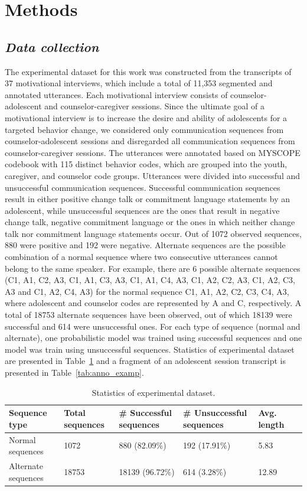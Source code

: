 \documentclass{amia}
\begin{document}
\section*{Methods}
\subsection*{\textit{Data collection}}
The experimental dataset for this work was constructed from the transcripts of 37 motivational interviews, which include a total of 11,353 segmented and annotated utterances. Each motivational interview consists of counselor-adolescent and counselor-caregiver sessions. Since the ultimate goal of a motivational interview is to increase the desire and ability of adolescents for a targeted behavior change, we considered only communication sequences from counselor-adolescent sessions and disregarded all communication sequences from counselor-caregiver sessions. The utterances were annotated based on MYSCOPE codebook \cite{carcone2013provider} with 115 distinct behavior codes, which are grouped into the youth, caregiver, and counselor code groups. Utterances were divided into successful and unsuccessful communication sequences. Successful communication sequences result in either positive change talk or commitment language statements by an adolescent, while unsuccessful sequences are the ones that result in negative change talk, negative commitment language or the ones in which neither change talk nor commitment language statements occur. Out of 1072 observed sequences, 880 were positive and 192 were negative. Alternate sequences are the possible combination of a normal sequence where two consecutive utterances cannot belong to the same speaker. For example, there are 6 possible alternate sequences ({C1, A1, C2, A3}, {C1, A1, C3, A3}, {C1, A1, C4, A3}, {C1, A2, C2, A3}, {C1, A2, C3, A3} and {C1, A2, C4, A3}) for the normal sequence {C1, A1, A2, C2, C3, C4, A3}, where adolescent and counselor codes are represented by A and C, respectively. A total of 18753 alternate sequences have been observed, out of which 18139 were successful and 614 were unsuccessful ones. For each type of sequence (normal and alternate), one probabilistic model was trained using successful sequences and one model was train using unsuccessful sequences. Statistics of experimental dataset are presented in Table~\ref{tab:data_dist} and a fragment of an adolescent session transcript is presented in Table~\ref{tab:anno_examp}. \\

\begin{table}[h]
\centering
\caption{Statistics of experimental dataset.}
\label{tab:data_dist}
  \begin{tabular}{|l|l|l|l|l|l|}
  \hline
   \textbf{Sequence type} & \textbf{Total sequences}  & \textbf{\# Successful sequences}  & \textbf{\# Unsuccessful sequences} & \textbf{Avg. length} \\ \hline      
 Normal sequences & 1072 & 880 (82.09\%) & 192 (17.91\%) & 5.83 \\\hline
Alternate sequences & 18753 & 18139 (96.72\%) & 614 (3.28\%) & 12.89 \\\hline 
  \end{tabular}
\end{table} 
\end{document}
